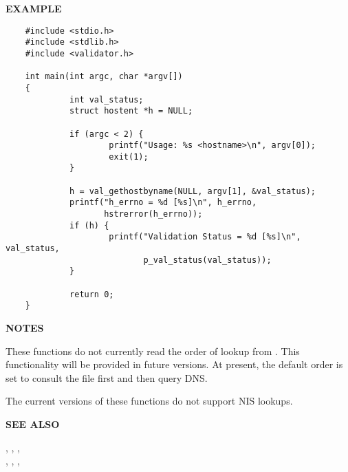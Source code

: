 {\bf EXAMPLE}

\begin{verbatim}
    #include <stdio.h>
    #include <stdlib.h>
    #include <validator.h>

    int main(int argc, char *argv[])
    {
             int val_status;
             struct hostent *h = NULL;

             if (argc < 2) {
                     printf("Usage: %s <hostname>\n", argv[0]);
                     exit(1);
             }
    
             h = val_gethostbyname(NULL, argv[1], &val_status);
             printf("h_errno = %d [%s]\n", h_errno,
                    hstrerror(h_errno));
             if (h) {
                     printf("Validation Status = %d [%s]\n", val_status,
                            p_val_status(val_status));
             }

             return 0;
    }
\end{verbatim}

{\bf NOTES}

These functions do not currently read the order of lookup from
.  This functionality will be provided in
future versions.  At present, the default order is set to consult
the  file first and then query DNS.

The current versions of these functions do not support NIS lookups.

{\bf SEE ALSO}

, , ,
 \\
, , ,

